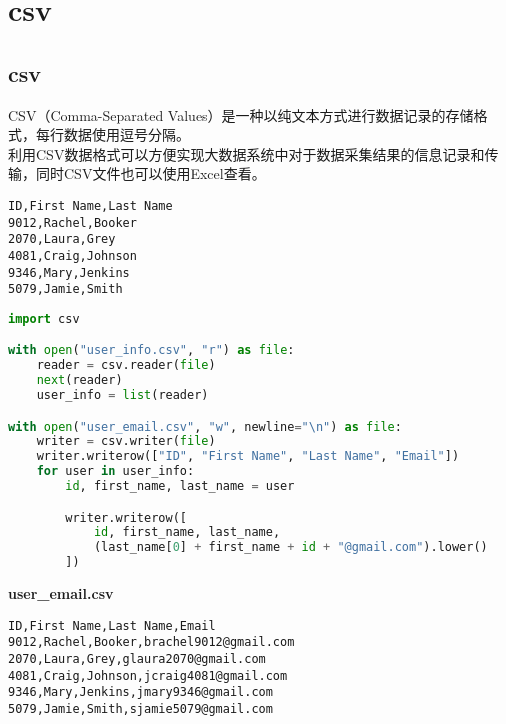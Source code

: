 \newpage

\section{csv}

\subsection{csv}

CSV（Comma-Separated Values）是一种以纯文本方式进行数据记录的存储格式，每行数据使用逗号分隔。\\

利用CSV数据格式可以方便实现大数据系统中对于数据采集结果的信息记录和传输，同时CSV文件也可以使用Excel查看。\\


\begin{lstlisting}[title=user\_info.csv]
ID,First Name,Last Name
9012,Rachel,Booker
2070,Laura,Grey
4081,Craig,Johnson
9346,Mary,Jenkins
5079,Jamie,Smith
\end{lstlisting}

\begin{lstlisting}[language=Python]
import csv

with open("user_info.csv", "r") as file:
    reader = csv.reader(file)
    next(reader)
    user_info = list(reader)

with open("user_email.csv", "w", newline="\n") as file:
    writer = csv.writer(file)
    writer.writerow(["ID", "First Name", "Last Name", "Email"])
    for user in user_info:
        id, first_name, last_name = user

        writer.writerow([
            id, first_name, last_name,
            (last_name[0] + first_name + id + "@gmail.com").lower()
        ])
\end{lstlisting}

\begin{tcolorbox}
    \textbf{user\_email.csv}
    \begin{verbatim}
ID,First Name,Last Name,Email
9012,Rachel,Booker,brachel9012@gmail.com
2070,Laura,Grey,glaura2070@gmail.com
4081,Craig,Johnson,jcraig4081@gmail.com
9346,Mary,Jenkins,jmary9346@gmail.com
5079,Jamie,Smith,sjamie5079@gmail.com
\end{verbatim}
\end{tcolorbox}

\newpage